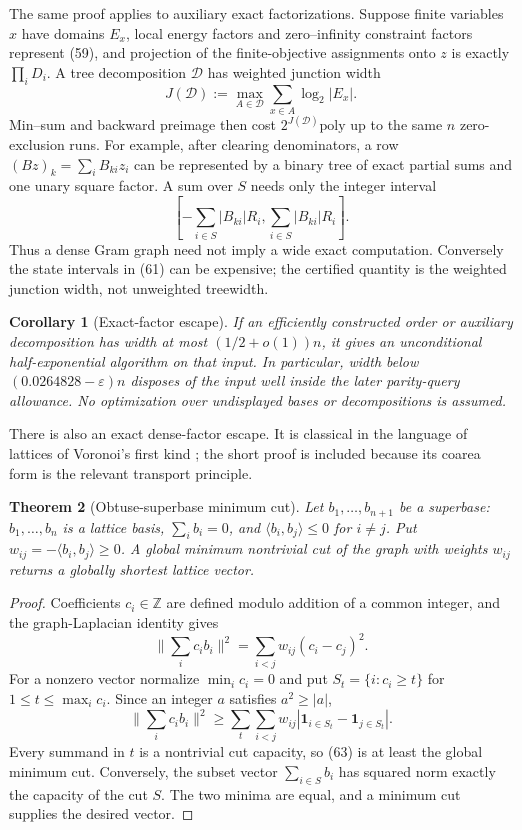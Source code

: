 \documentclass[10pt]{article}
\newtheorem{theorem}{Theorem}[section]
\newtheorem{corollary}[theorem]{Corollary}
\theoremstyle{definition}
\newcommand{\Z}{\mathbb{Z}}
\newcommand{\poly}{\mathrm{poly}}
\newcommand{\ip}[2]{\langle #1,#2\rangle}
\newcommand{\norm}[1]{\lVert #1\rVert}
\begin{document}
The same proof applies to auxiliary exact factorizations.  Suppose finite
variables $x$ have domains $E_x$, local energy factors and zero--infinity
constraint factors represent (59), and projection of the finite-objective
assignments onto $z$ is exactly $\prod_iD_i$.  A tree decomposition
$\mathcal D$ has weighted junction width
\[
 J(\mathcal D):=\max_{A\in\mathcal D}
                 \sum_{x\in A}\log_2|E_x|.                    \tag{60}
\]
Min--sum and backward preimage then cost $2^{J(\mathcal D)}\poly$ up to the
same $n$ zero-exclusion runs.  For example, after clearing denominators, a
row $(Bz)_k=\sum_iB_{ki}z_i$ can be represented by a binary tree of exact
partial sums and one unary square factor.  A sum over $S$ needs only the
integer interval
\[
 \left[-\sum_{i\in S}|B_{ki}|R_i,
        \sum_{i\in S}|B_{ki}|R_i\right].                       \tag{61}
\]
Thus a dense Gram graph need not imply a wide exact computation.  Conversely
the state intervals in (61) can be expensive; the certified quantity is the
weighted junction width, not unweighted treewidth.

\begin{corollary}[Exact-factor escape]                           \label{cor:gdl}
If an efficiently constructed order or auxiliary decomposition has width at
most $(1/2+o(1))n$, it gives an unconditional half-exponential algorithm on
that input.  In particular, width below
$(0.0264828-\varepsilon)n$ disposes of the input well inside the later
parity-query allowance.  No optimization over undisplayed bases or
decompositions is assumed.
\end{corollary}

There is also an exact dense-factor escape.  It is classical in the language
of lattices of Voronoi's first kind \cite{McKilliamGrant12}; the short proof
is included because its coarea form is the relevant transport principle.

\begin{theorem}[Obtuse-superbase minimum cut]                   \label{thm:mincut}
Let $b_1,\ldots,b_{n+1}$ be a superbase: $b_1,\ldots,b_n$ is a
lattice basis, $\sum_i b_i=0$, and
$\ip{b_i}{b_j}\le0$ for $i\ne j$.  Put
$w_{ij}=-\ip{b_i}{b_j}\ge0$.  A global minimum nontrivial cut of the graph
with weights $w_{ij}$ returns a globally shortest lattice vector.
\end{theorem}

\begin{proof}
Coefficients $c_i\in\Z$ are defined modulo addition of a common integer, and
the graph-Laplacian identity gives
\[
 \norm{\sum_i c_ib_i}^2
   =\sum_{i<j}w_{ij}(c_i-c_j)^2.                               \tag{62}
\]
For a nonzero vector normalize $\min_i c_i=0$ and put
$S_t=\{i:c_i\ge t\}$ for $1\le t\le\max_i c_i$.  Since an integer $a$
satisfies $a^2\ge|a|$,
\[
 \norm{\sum_i c_ib_i}^2
 \ge\sum_t\sum_{i<j}w_{ij}
       |\mathbf1_{i\in S_t}-\mathbf1_{j\in S_t}|.             \tag{63}
\]
Every summand in $t$ is a nontrivial cut capacity, so (63) is at least the
global minimum cut.  Conversely, the subset vector $\sum_{i\in S}b_i$ has
squared norm exactly the capacity of the cut $S$.  The two minima are equal,
and a minimum cut supplies the desired vector.
\end{proof}
\end{document}
